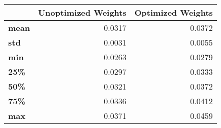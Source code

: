 \begin{tabular}{lrr}
\toprule
{} &  Unoptimized Weights &  Optimized Weights \\
\midrule
\textbf{mean} &               0.0317 &             0.0372 \\
\textbf{std } &               0.0031 &             0.0055 \\
\textbf{min } &               0.0263 &             0.0279 \\
\textbf{25\% } &               0.0297 &             0.0333 \\
\textbf{50\% } &               0.0321 &             0.0372 \\
\textbf{75\% } &               0.0336 &             0.0412 \\
\textbf{max } &               0.0371 &             0.0459 \\
\bottomrule
\end{tabular}
